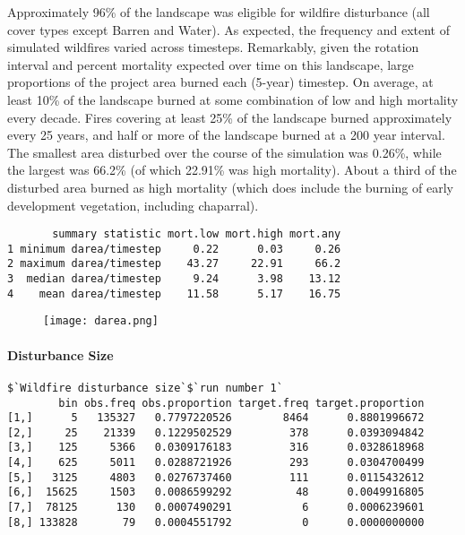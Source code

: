 Approximately 96\% of the landscape was eligible for wildfire disturbance (all cover types except Barren and Water). As expected, the frequency and extent of simulated wildfires varied across timesteps. Remarkably, given the rotation interval and percent mortality expected over time on this landscape, large proportions of the project area burned each (5-year) timestep. On average, at least 10\% of the landscape burned at some combination of low and high mortality every decade. Fires covering at least 25\% of the landscape burned approximately every 25 years, and half or more of the landscape burned at a 200 year interval. The smallest area disturbed over the course of the simulation was 0.26\%, while the largest was 66.2\% (of which 22.91\% was high mortality). About a third of the disturbed area burned as high mortality (which does include the burning of early development vegetation, including chaparral). 

\begin{verbatim}
       summary statistic mort.low mort.high mort.any
1 minimum darea/timestep     0.22      0.03     0.26
2 maximum darea/timestep    43.27     22.91     66.2
3  median darea/timestep     9.24      3.98    13.12
4    mean darea/timestep    11.58      5.17    16.75
\end{verbatim}

\begin{figure}
\texttt{[image: darea.png]}
\caption{}
\label{darea}
\end{figure}

\paragraph{Disturbance Size}
\begin{verbatim}
$`Wildfire disturbance size`$`run number 1`
        bin obs.freq obs.proportion target.freq target.proportion
[1,]      5   135327   0.7797220526        8464      0.8801996672
[2,]     25    21339   0.1229502529         378      0.0393094842
[3,]    125     5366   0.0309176183         316      0.0328618968
[4,]    625     5011   0.0288721926         293      0.0304700499
[5,]   3125     4803   0.0276737460         111      0.0115432612
[6,]  15625     1503   0.0086599292          48      0.0049916805
[7,]  78125      130   0.0007490291           6      0.0006239601
[8,] 133828       79   0.0004551792           0      0.0000000000
\end{verbatim}

